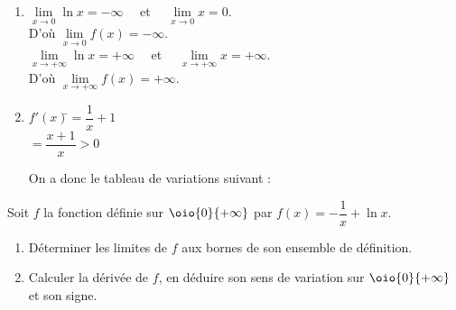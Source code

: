 \documentclass[a4paper,11pt,exos]{nsi} %
\begin{document}
\textcolor{UGLiBlue}{
    \begin{multicols}{2}
        \begin{enumerate}
            \item $\lim\limits_{x\to 0} \ln x=-\infty\quad$ et $\quad\lim\limits_{x\to 0} x=0$.\\[.5em]
            D'où $\lim\limits_{x\to 0} f(x)=-\infty$.\\[1em]
            $\lim\limits_{x\to +\infty} \ln x=+\infty\quad$ et $\quad\lim\limits_{x\to +\infty} x=+\infty$.\\[.5em]
            D'où $\lim\limits_{x\to +\infty} f(x)=+\infty$.
            \item \begin{tabbing}
                $f'(x)$\=$=\dfrac{1}{x}+1$\\[.5em]
                \>$=\dfrac{x+1}{x}>0$
            \end{tabbing}
            \vfill\null
            \columnbreak
            On a donc le tableau de variations suivant :
            \begin{center}
            \end{center}
        \end{enumerate}
    \end{multicols}
}

\exo{}
Soit $f$ la fonction définie sur $\oio{0}{+\infty}$ par $f(x)=-\dfrac{1}{x}+\ln x$.
\begin{enumerate}
    \item Déterminer les limites de $f$ aux bornes de son ensemble de définition.
    \item Calculer la dérivée de $f$, en déduire son sens de variation sur $\oio{0}{+\infty}$ et son signe.
\end{enumerate}
\end{document}
